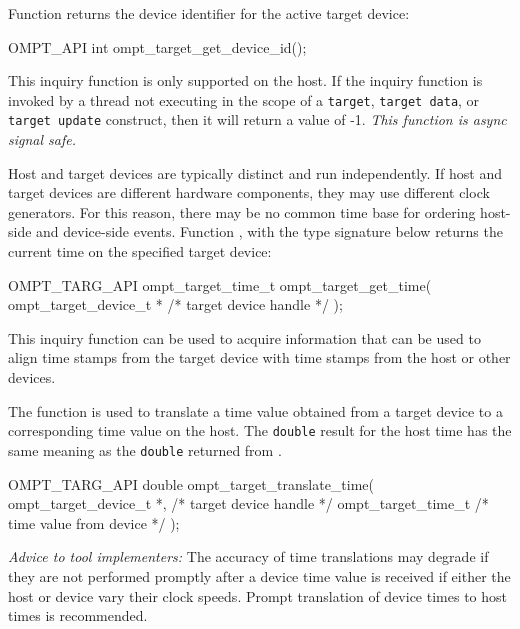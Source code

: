\documentclass{article}
\begin{document}
Function  returns the device identifier for the active target device:
\begin{boxedcode}
OMPT\_API int ompt\_target\_get\_device\_id();
\end{boxedcode}
This inquiry function is only supported on the host. If the inquiry function is invoked by a thread not executing in the scope of a {\tt target}, {\tt target data}, or {\tt target update} construct, then it will return a value of -1. {\it This function is async signal safe.}

Host and target devices are typically distinct and run independently. If 
host and target devices are different hardware components, they may 
use different clock generators. For this reason,  there may be no common time base for ordering host-side and device-side events.
Function , with the type signature below returns the current time on the specified target device:
\begin{boxedcode}
OMPT\_TARG\_API ompt\_target\_time\_t ompt\_target\_get\_time(
  ompt\_target\_device\_t *                      /* target device handle       */
);
\end{boxedcode}
This inquiry function can be used
to acquire information that can be used to align time stamps from the target device with time
stamps from the host or other devices.

The function  is used to translate a time value obtained from a target device to a corresponding time value on the host. The {\tt double} result for the host time has the same meaning as the {\tt double} returned from .
\begin{boxedcode}
OMPT\_TARG\_API double ompt\_target\_translate\_time(
  ompt\_target\_device\_t *,                     /* target device handle       */
  ompt\_target\_time\_t                            /* time value from device     */
);
\end{boxedcode}
\noindent
{\em Advice to tool implementers:} The accuracy of time translations may degrade if they are not performed promptly after a device time value is received if either the host or device vary their clock speeds. Prompt translation of device times to host times is recommended.
\end{document}
